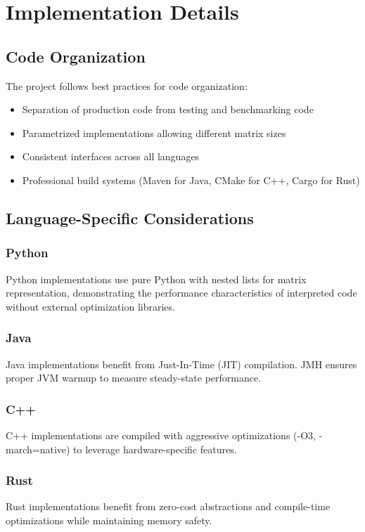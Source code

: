 \documentclass[11pt,a4paper]{article}
\begin{document}
\section{Implementation Details}

\subsection{Code Organization}

The project follows best practices for code organization:

\begin{itemize}
    \item Separation of production code from testing and benchmarking code
    \item Parametrized implementations allowing different matrix sizes
    \item Consistent interfaces across all languages
    \item Professional build systems (Maven for Java, CMake for C++, Cargo for Rust)
\end{itemize}

\subsection{Language-Specific Considerations}

\subsubsection{Python}
Python implementations use pure Python with nested lists for matrix representation, demonstrating the performance characteristics of interpreted code without external optimization libraries.

\subsubsection{Java}
Java implementations benefit from Just-In-Time (JIT) compilation. JMH ensures proper JVM warmup to measure steady-state performance.

\subsubsection{C++}
C++ implementations are compiled with aggressive optimizations (-O3, -march=native) to leverage hardware-specific features.

\subsubsection{Rust}
Rust implementations benefit from zero-cost abstractions and compile-time optimizations while maintaining memory safety.
\end{document}

